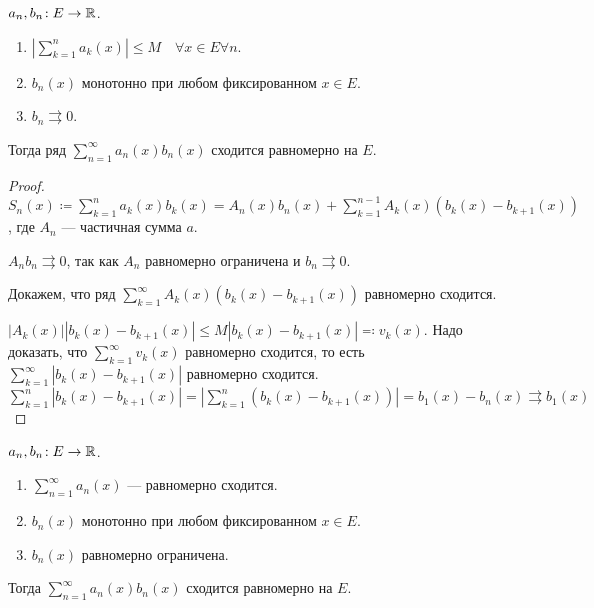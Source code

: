 \begin{theorem}
    $a_n, b_n\!: E \to \mathbb{R}$.
     \begin{enumerate}
         \item $\left|\sum\limits_{k=1}^n a_k(x)\right| \le M \quad \forall x \in E \forall n$.
         \item $b_n(x)$ монотонно при любом фиксированном $x \in E$.
         \item  $b_n \rightrightarrows 0$.
    \end{enumerate}

    Тогда ряд $\sum\limits_{n=1}^\infty a_n(x)b_n(x)$ сходится равномерно на  $E$.
\end{theorem}
\begin{proof}
   $S_n(x) \coloneqq \sum\limits_{k=1}^n a_k(x)b_k(x) = A_n(x)b_n(x) + \sum\limits_{k=1}^{n-1}A_k(x)(b_k(x) - b_{k+1}(x))$, где $A_n$ --- частичная сумма  $a$.

   $A_nb_n \rightrightarrows 0$, так как  $A_n$ равномерно ограничена и  $b_n \rightrightarrows 0$.

   Докажем, что ряд $\sum\limits_{k=1}^\infty A_k(x)(b_k(x) - b_{k+1}(x))$ равномерно сходится.

   $|A_k(x)| |b_k(x) - b_{k+1}(x)| \le M|b_k(x) - b_{k+1}(x)| \eqqcolon v_k(x)$. Надо доказать, что $\sum\limits_{k=1}^\infty v_k(x)$ равномерно сходится, то есть  $\sum\limits_{k=1}^\infty |b_k(x) - b_{k+1}(x)|$ равномерно сходится. $\sum\limits_{k=1}^n |b_k(x) - b_{k+1}(x)| = |\sum\limits_{k=1}^n (b_k(x) - b_{k+1}(x))| = b_1(x) - b_n(x) \rightrightarrows b_1(x)$
\end{proof}
\begin{theorem}
    $a_n, b_n\!: E \to \mathbb{R}$.
     \begin{enumerate}
         \item $\sum\limits_{n=1}^\infty a_n(x)$ --- равномерно сходится.
         \item  $b_n(x)$ монотонно при любом фиксированном  $x \in E$.
         \item  $b_n(x)$ равномерно ограничена.
    \end{enumerate}

    Тогда $\sum\limits_{n=1}^\infty a_n(x)b_n(x)$ сходится равномерно на  $E$.
\end{theorem}
